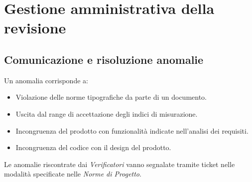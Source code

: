 \section{Gestione amministrativa della revisione}

	\subsection{Comunicazione e risoluzione anomalie}
	Un anomalia corrisponde a:
	\begin{itemize}
		\item Violazione delle norme tipografiche da parte di un documento.
		\item Uscita dal range di accettazione degli indici di misurazione. %
		\item Incongruenza del prodotto con funzionalità indicate nell'analisi dei requisiti.
		\item Incongruenza del codice con il design del prodotto.
	\end{itemize}
	Le anomalie riscontrate dai \emph{Verificatori} vanno segnalate tramite ticket nelle modalità specificate nelle \emph{Norme di Progetto}.
	
	
